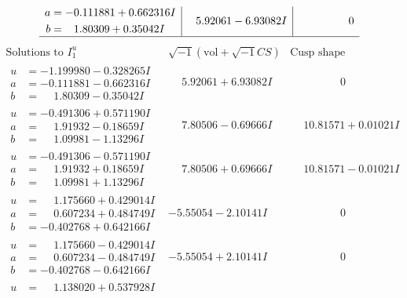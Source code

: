 \documentclass[1p]{elsarticle_modified}
\theoremstyle{definition}
\newcommand{\I}{\sqrt{-1}}
\begin{document}
$$\begin{array}{c|c|c}
\begin{aligned}
a &= -0.111881 + 0.662316 I \\
b &= \phantom{-}1.80309 + 0.35042 I\end{aligned}
 & \phantom{-}5.92061 - 6.93082 I & \phantom{-0.000000 } 0\\
 \hline 
 \end{array}$$\newpage$$\begin{array}{c|c|c}  
\text{Solutions to }I^u_{1}& \I (\text{vol} + \sqrt{-1}CS) & \text{Cusp shape}\\
 \hline 
\begin{aligned}
u &= -1.199980 - 0.328265 I \\
a &= -0.111881 - 0.662316 I \\
b &= \phantom{-}1.80309 - 0.35042 I\end{aligned}
 & \phantom{-}5.92061 + 6.93082 I & \phantom{-0.000000 } 0 \\ \hline\begin{aligned}
u &= -0.491306 + 0.571190 I \\
a &= \phantom{-}1.91932 - 0.18659 I \\
b &= \phantom{-}1.09981 - 1.13296 I\end{aligned}
 & \phantom{-}7.80506 - 0.69666 I & \phantom{-}10.81571 + 0.01021 I \\ \hline\begin{aligned}
u &= -0.491306 - 0.571190 I \\
a &= \phantom{-}1.91932 + 0.18659 I \\
b &= \phantom{-}1.09981 + 1.13296 I\end{aligned}
 & \phantom{-}7.80506 + 0.69666 I & \phantom{-}10.81571 - 0.01021 I \\ \hline\begin{aligned}
u &= \phantom{-}1.175660 + 0.429014 I \\
a &= \phantom{-}0.607234 + 0.484749 I \\
b &= -0.402768 + 0.642166 I\end{aligned}
 & -5.55054 - 2.10141 I & \phantom{-0.000000 } 0 \\ \hline\begin{aligned}
u &= \phantom{-}1.175660 - 0.429014 I \\
a &= \phantom{-}0.607234 - 0.484749 I \\
b &= -0.402768 - 0.642166 I\end{aligned}
 & -5.55054 + 2.10141 I & \phantom{-0.000000 } 0 \\ \hline\begin{aligned}
u &= \phantom{-}1.138020 + 0.537928 I \\

\end{aligned}
\end{array}$$
\end{document}
